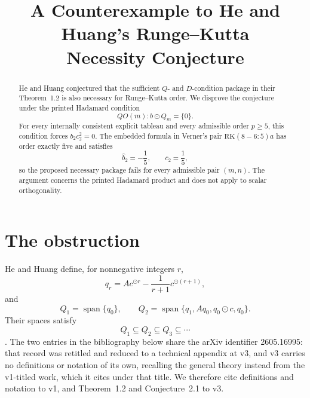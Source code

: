 \documentclass[11pt]{amsart}
\title{A Counterexample to He and Huang's Runge--Kutta\\
Necessity Conjecture}
\date{}
\begin{document}
\begin{abstract}
He and Huang conjectured that the sufficient \(Q\)- and \(D\)-condition
package in their Theorem~1.2 is also necessary for Runge--Kutta order.
We disprove the conjecture under the printed Hadamard condition
\[
QO(m): b\odot Q_m=\{0\}.
\]
For every internally consistent explicit tableau and every admissible
order \(p\ge 5\), this condition forces \(b_2c_2^2=0\). The embedded
formula in Verner's pair \(\mathrm{RK}(8\!-\!6{:}5)a\) has order
exactly five and satisfies
\[
\widehat b_2=-\frac15,
\qquad
c_2=\frac15,
\]
so the proposed necessary package fails for every admissible pair
\((m,n)\). The argument concerns the printed Hadamard product and does
not apply to scalar orthogonality.
\end{abstract}

\maketitle

\section{The obstruction}

He and Huang define, for nonnegative integers \(r\),
\[
q_r
 =A c^{\odot r}
  -\frac{1}{r+1}c^{\odot(r+1)},
\]
and
\[
Q_1=\operatorname{span}\{q_0\},
\qquad
Q_2=\operatorname{span}
 \{q_1,Aq_0,q_0\odot c,q_0\}.
\]
Their spaces satisfy
\[
Q_1\subseteq Q_2\subseteq Q_3\subseteq\cdots
\]
\cite[Defs.~3.4 and 3.9, Eq.~(16)]{HeHuangTheory}.
The two entries in the bibliography below share the arXiv identifier
2605.16995: that record was retitled and reduced to a technical appendix
at v3, and v3 carries no definitions or notation of its own, recalling
the general theory instead from the v1-titled work, which it cites under
that title. We therefore cite definitions and notation to v1, and
Theorem~1.2 and Conjecture~2.1 to v3.
\end{document}
